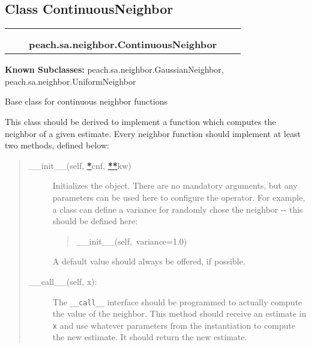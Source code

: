 
\subsection{Class ContinuousNeighbor}

    \label{peach:sa:neighbor:ContinuousNeighbor}
\begin{tabular}{cccccc}
\multicolumn{2}{r}{\settowidth{\BCL}{object}\multirow{2}{\BCL}{object}}
&&
  \\\cline{3-3}
  &&\multicolumn{1}{c|}{}
&&
  \\
&&\multicolumn{2}{l}{\textbf{peach.sa.neighbor.ContinuousNeighbor}}
\end{tabular}

\textbf{Known Subclasses:}
peach.sa.neighbor.GaussianNeighbor,
    peach.sa.neighbor.UniformNeighbor


Base class for continuous neighbor functions

This class should be derived to implement a function which computes the
neighbor of a given estimate. Every neighbor function should implement at
least two methods, defined below:
%
\begin{quote}
%
\begin{description}
\item[{\_\_init\_\_(self, %
\hyperlink{id1}{\textbf{\color{red}*}}cnf, %
\hyperlink{id3}{\textbf{\color{red}**}}kw)}] \leavevmode 
Initializes the object. There are no mandatory arguments, but any
parameters can be used here to configure the operator. For example, a
class can define a variance for randomly chose the neighbor -{}- this
should be defined here:
%
\begin{quote}{\ttfamily \raggedright \noindent
\_\_init\_\_(self,~variance=1.0)
}
\end{quote}

A default value should always be offered, if possible.

\item[{\_\_call\_\_(self, x):}] \leavevmode 
The \texttt{\_\_call\_\_} interface should be programmed to actually compute the
value of the neighbor. This method should receive an estimate in \texttt{x}
and use whatever parameters from the instantiation to compute the new
estimate. It should return the new estimate.

\end{description}

\end{quote}


